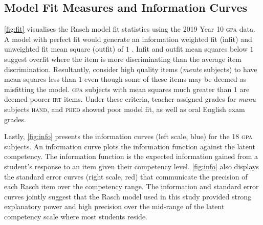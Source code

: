 \subsection{Model Fit Measures and Information Curves}

\cref{fig:fit} visualises the Rasch model fit statistics using the 2019 Year 10 \textsc{gpa} data. A model with perfect fit would generate an information weighted fit (infit) and unweighted fit mean square (outfit) of $1$ \parencite{wu:2016}. Infit and outfit mean squares below $1$ suggest overfit where the item is more discriminating than the average item discrimination. Resultantly, \textcite{wu:2016} consider high quality items (\textit{mente} subjects) to have mean squares less than $1$ even though some of these items may be deemed as misfitting the model. \textsc{gpa} subjects with mean squares much greater than $1$ are deemed poorer \textsc{irt} items. Under these criteria, teacher-assigned grades for \textit{manu} subjects \textsc{hand}, and \textsc{phed} showed poor model fit, as well as oral English exam grades.

Lastly, \cref{fig:info} presents the information curves (left scale, blue) for the 18 \textsc{gpa} subjects. An information curve plots the information function against the latent competency. The information function is the expected information gained from a student's response to an item given their competency level. \cref{fig:info} also displays the standard error curves (right scale, red) that communicate the precision of each Rasch item over the competency range. The information and standard error curves jointly suggest that the Rasch model used in this study provided strong explanatory power and high precision over the mid-range of the latent competency scale where most students reside.
